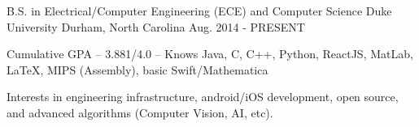 \begin{cventries}
  \cventry
    {B.S. in Electrical/Computer Engineering (ECE) and Computer Science}
    {Duke University}
    {Durham, North Carolina}
    {Aug. 2014 - PRESENT}
    {
      \begin{cvitems}
        \item {Cumulative GPA -- 3.881/4.0 -- Knows Java, C, C++, Python, ReactJS, MatLab, LaTeX, MIPS (Assembly), basic Swift/Mathematica}
        \item {Interests in engineering infrastructure, android/iOS development, open source, and advanced algorithms (Computer Vision, AI, etc).}
      \end{cvitems}
    }
\end{cventries}
